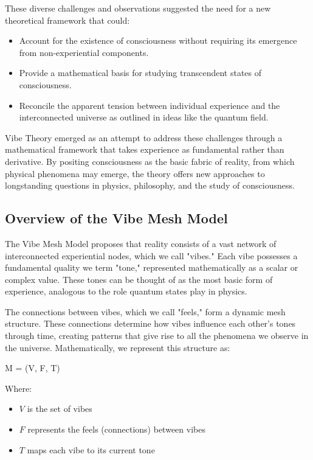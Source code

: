 \documentclass{article}
\let\oldequation\equation
\let\endoldequation\endequation
\renewenvironment{equation}{%
    \noindent\vspace{-\parskip}\vspace{-\baselineskip}%
    \oldequation
}{%
    \endoldequation
    \noindent\vspace{-\parskip}\vspace{-\baselineskip}%
}
\theoremstyle{definition}
\theoremstyle{axiom}
\theoremstyle{theorem}
\theoremstyle{proposition}
\begin{document}
These diverse challenges and observations suggested the need for a new theoretical framework that could:
\begin{itemize}
\item Account for the existence of consciousness without requiring its emergence from non-experiential components.
\item Provide a mathematical basis for studying transcendent states of consciousness.
\item Reconcile the apparent tension between individual experience and the interconnected universe as outlined in ideas like the quantum field.
\end{itemize}

Vibe Theory emerged as an attempt to address these challenges through a mathematical framework that takes experience as fundamental rather than derivative. By positing consciousness as the basic fabric of reality, from which physical phenomena may emerge, the theory offers new approaches to longstanding questions in physics, philosophy, and the study of consciousness.

\subsection{Overview of the Vibe Mesh Model}

The Vibe Mesh Model proposes that reality consists of a vast network of interconnected experiential nodes, which we call "vibes." Each vibe possesses a fundamental quality we term "tone," represented mathematically as a scalar or complex value. These tones can be thought of as the most basic form of experience, analogous to the role quantum states play in physics.

The connections between vibes, which we call "feels," form a dynamic mesh structure. These connections determine how vibes influence each other's tones through time, creating patterns that give rise to all the phenomena we observe in the universe. Mathematically, we represent this structure as:

\begin{equation}
M = (V, F, T)
\end{equation}

Where:
\begin{itemize}
\item $V$ is the set of vibes
\item $F$ represents the feels (connections) between vibes
\item $T$ maps each vibe to its current tone
\end{itemize}
\end{document}
